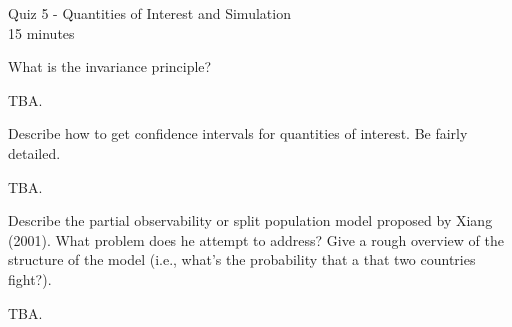 \documentclass[10pt]{exam2}
\begin{document}
\begin{center}
{\LARGE Quiz 5 - Quantities of Interest and Simulation}\\\vspace{2mm}
\vspace{3mm}
{\large 15 minutes}\\\vspace{2mm}
\end{center}

\begin{questions}

\question What is the invariance principle?
\begin{solution}[2in]
TBA.
\end{solution}

\question Describe how to get confidence intervals for quantities of interest. Be fairly detailed.
\begin{solution}[3in]
TBA.
\end{solution}

\question Describe the partial observability or split population model proposed by Xiang (2001). What problem does he attempt to address? Give a rough overview of the structure of the model (i.e., what's the probability that a that two countries fight?).
\begin{solution}[.1in]
TBA.
\end{solution}

\end{questions}
\end{document}
